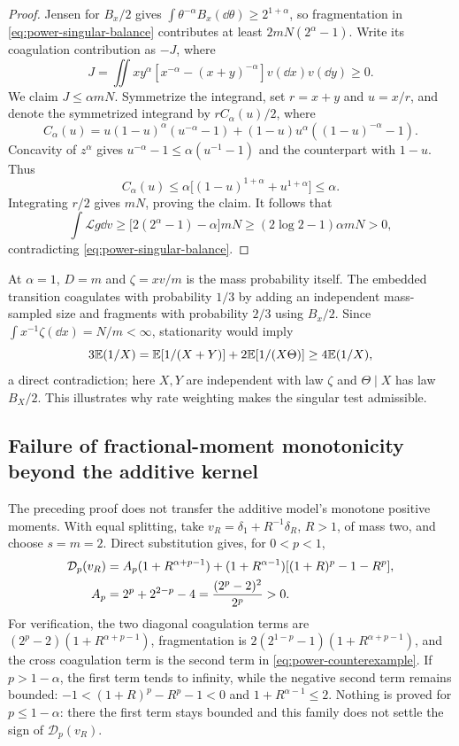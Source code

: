 \begin{proof}
Jensen for $B_x/2$ gives
$\int\theta^{-\alpha}B_x(\dd\theta)\geq2^{1+\alpha}$, so fragmentation
in \eqref{eq:power-singular-balance} contributes at least
$2mN(2^\alpha-1)$. Write its coagulation contribution as $-J$, where
\[
 J=\iint xy^\alpha[x^{-\alpha}-(x+y)^{-\alpha}]v(\dd x)v(\dd y)\geq0.
\]
We claim $J\leq\alpha mN$. Symmetrize the integrand, set $r=x+y$ and
$u=x/r$, and denote the symmetrized integrand by $rC_\alpha(u)/2$, where
\[
 C_\alpha(u)=u(1-u)^\alpha(u^{-\alpha}-1)
 +(1-u)u^\alpha((1-u)^{-\alpha}-1).
\]
Concavity of $z^\alpha$ gives
$u^{-\alpha}-1\leq\alpha(u^{-1}-1)$ and the counterpart with $1-u$.
Thus
\[
 C_\alpha(u)\leq\alpha\bigl[(1-u)^{1+\alpha}+u^{1+\alpha}\bigr]
 \leq\alpha.
\]
Integrating $r/2$ gives $mN$, proving the claim. It follows that
\begin{equation}
 \int\mathcal Lg\dd v
 \geq\bigl[2(2^\alpha-1)-\alpha\bigr]mN
 \geq(2\log2-1)\alpha mN>0,
 \label{eq:power-positive-drift}
\end{equation}
contradicting \eqref{eq:power-singular-balance}.
\end{proof}

At $\alpha=1$, $D=m$ and $\zeta=xv/m$ is the mass probability itself.
The embedded transition coagulates with probability $1/3$ by adding an
independent mass-sampled size and fragments with probability $2/3$ using
$B_x/2$. Since $\int x^{-1}\zeta(\dd x)=N/m<\infty$, stationarity would
imply
\[
 3\mathbb E(1/X)=\mathbb E[1/(X+Y)]+2\mathbb E[1/(X\Theta)]\geq4\mathbb E(1/X),
\]
a direct contradiction; here $X,Y$ are independent with law $\zeta$ and
$\Theta\mid X$ has law $B_X/2$. This illustrates why rate weighting makes
the singular test admissible.

\subsection{Failure of fractional-moment monotonicity beyond the additive kernel}

The preceding proof does not transfer the additive model's monotone
positive moments. With equal splitting, take
$v_R=\delta_1+R^{-1}\delta_R$, $R>1$, of mass two, and choose $s=m=2$.
Direct substitution gives, for $0<p<1$,
\begin{align}
 \mathcal D_p(v_R)
 &=A_p(1+R^{\alpha+p-1})
 +(1+R^{\alpha-1})[(1+R)^p-1-R^p],\label{eq:power-counterexample}\\
 A_p&=2^p+2^{2-p}-4=\frac{(2^p-2)^2}{2^p}>0.\notag
\end{align}
For verification, the two diagonal coagulation terms are
$(2^p-2)(1+R^{\alpha+p-1})$, fragmentation is
$2(2^{1-p}-1)(1+R^{\alpha+p-1})$, and the cross coagulation term is the
second term in \eqref{eq:power-counterexample}. If $p>1-\alpha$, the first
term tends to infinity, while the negative second term remains bounded:
$-1<(1+R)^p-R^p-1<0$ and $1+R^{\alpha-1}\leq2$.
Nothing is proved for $p\leq1-\alpha$: there the first term stays
bounded and this family does not settle the sign of
$\mathcal D_p(v_R)$.

